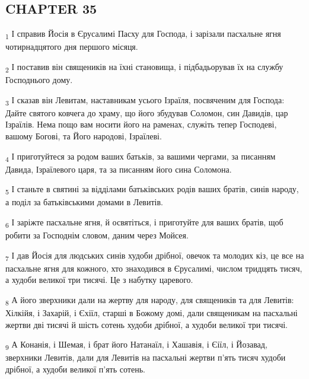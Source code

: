 \subsection{CHAPTER 35}
\begin{tcolorbox}
\textsubscript{1} І справив Йосія в Єрусалимі Пасху для Господа, і зарізали пасхальне ягня чотирнадцятого дня першого місяця.
\end{tcolorbox}
\begin{tcolorbox}
\textsubscript{2} І поставив він священиків на їхні становища, і підбадьорував їх на службу Господнього дому.
\end{tcolorbox}
\begin{tcolorbox}
\textsubscript{3} І сказав він Левитам, наставникам усього Ізраїля, посвяченим для Господа: Дайте святого ковчега до храму, що його збудував Соломон, син Давидів, цар Ізраїлів. Нема пощо вам носити його на раменах, служіть тепер Господеві, вашому Богові, та Його народові, Ізраїлеві.
\end{tcolorbox}
\begin{tcolorbox}
\textsubscript{4} І приготуйтеся за родом ваших батьків, за вашими чергами, за писанням Давида, Ізраїлевого царя, та за писанням його сина Соломона.
\end{tcolorbox}
\begin{tcolorbox}
\textsubscript{5} І станьте в святині за відділами батьківських родів ваших братів, синів народу, а поділ за батьківськими домами в Левитів.
\end{tcolorbox}
\begin{tcolorbox}
\textsubscript{6} І заріжте пасхальне ягня, й освятіться, і приготуйте для ваших братів, щоб робити за Господнім словом, даним через Мойсея.
\end{tcolorbox}
\begin{tcolorbox}
\textsubscript{7} І дав Йосія для людських синів худоби дрібної, овечок та молодих кіз, це все на пасхальне ягня для кожного, хто знаходився в Єрусалимі, числом тридцять тисяч, а худоби великої три тисячі. Це з набутку царевого.
\end{tcolorbox}
\begin{tcolorbox}
\textsubscript{8} А його зверхники дали на жертву для народу, для священиків та для Левитів: Хілкійя, і Захарій, і Єхіїл, старші в Божому домі, дали священикам на пасхальні жертви дві тисячі й шість сотень худоби дрібної, а худоби великої три тисячі.
\end{tcolorbox}
\begin{tcolorbox}
\textsubscript{9} А Конанія, і Шемая, і брат його Натанаїл, і Хашавія, і Єіїл, і Йозавад, зверхники Левитів, дали для Левитів на пасхальні жертви п'ять тисяч худоби дрібної, а худоби великої п'ять сотень.
\end{tcolorbox}

